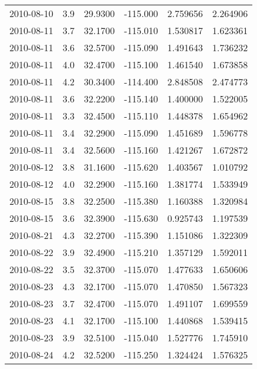 \begin{tabular}{lrrrrr}
2010-08-10 &       3.9 &  29.9300 &  -115.000 &         2.759656 &         2.264906 \\
2010-08-11 &       3.7 &  32.1700 &  -115.010 &         1.530817 &         1.623361 \\
2010-08-11 &       3.6 &  32.5700 &  -115.090 &         1.491643 &         1.736232 \\
2010-08-11 &       4.0 &  32.4700 &  -115.100 &         1.461540 &         1.673858 \\
2010-08-11 &       4.2 &  30.3400 &  -114.400 &         2.848508 &         2.474773 \\
2010-08-11 &       3.6 &  32.2200 &  -115.140 &         1.400000 &         1.522005 \\
2010-08-11 &       3.3 &  32.4500 &  -115.110 &         1.448378 &         1.654962 \\
2010-08-11 &       3.4 &  32.2900 &  -115.090 &         1.451689 &         1.596778 \\
2010-08-11 &       3.4 &  32.5600 &  -115.160 &         1.421267 &         1.672872 \\
2010-08-12 &       3.8 &  31.1600 &  -115.620 &         1.403567 &         1.010792 \\
2010-08-12 &       4.0 &  32.2900 &  -115.160 &         1.381774 &         1.533949 \\
2010-08-15 &       3.8 &  32.2500 &  -115.380 &         1.160388 &         1.320984 \\
2010-08-15 &       3.6 &  32.3900 &  -115.630 &         0.925743 &         1.197539 \\
2010-08-21 &       4.3 &  32.2700 &  -115.390 &         1.151086 &         1.322309 \\
2010-08-22 &       3.9 &  32.4900 &  -115.210 &         1.357129 &         1.592011 \\
2010-08-22 &       3.5 &  32.3700 &  -115.070 &         1.477633 &         1.650606 \\
2010-08-23 &       4.3 &  32.1700 &  -115.070 &         1.470850 &         1.567323 \\
2010-08-23 &       3.7 &  32.4700 &  -115.070 &         1.491107 &         1.699559 \\
2010-08-23 &       4.1 &  32.1700 &  -115.100 &         1.440868 &         1.539415 \\
2010-08-23 &       3.9 &  32.5100 &  -115.040 &         1.527776 &         1.745910 \\
2010-08-24 &       4.2 &  32.5200 &  -115.250 &         1.324424 &         1.576325 \\

\end{tabular}
